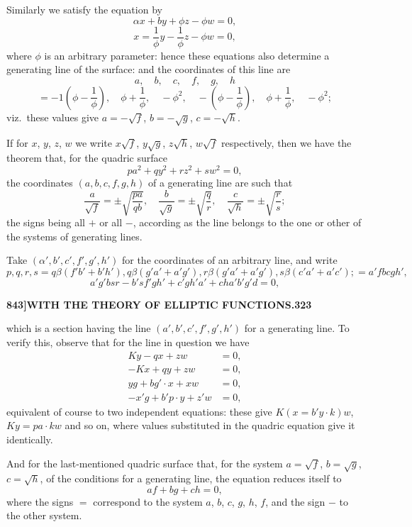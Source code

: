 \documentclass[11pt,a4paper]{book}
\begin{document}
Similarly we satisfy the equation by
\[
\alpha x + by + \phi z - \phi w = 0,
\]
\[
x = \frac{1}{\phi}y - \frac{1}{\phi}z - \phi w = 0,
\]
where $\phi$ is an arbitrary parameter: hence these equations also determine a generating line of the surface: and the coordinates of this line are
\[
a, \quad b, \quad c, \quad f, \quad g, \quad h
\]
\[
= -1\left(\phi - \frac{1}{\phi}\right), \quad \phi + \frac{1}{\phi}, \quad -\phi^2, \quad -\left(\phi - \frac{1}{\phi}\right), \quad \phi + \frac{1}{\phi}, \quad -\phi^2;
\]
viz.\ these values give $a = -\sqrt{f}$, $b = -\sqrt{g}$, $c = -\sqrt{h}$.

If for $x$, $y$, $z$, $w$ we write $x\sqrt{f}$, $y\sqrt{g}$, $z\sqrt{h}$, $w\sqrt{f}$ respectively, then we have the theorem that, for the quadric surface
\[
pa^2 + qy^2 + rz^2 + sw^2 = 0,
\]
the coordinates $(a, b, c, f, g, h)$ of a generating line are such that
\[
\frac{a}{\sqrt{f}} = \pm \sqrt{\frac{pa}{qb}}, \quad \frac{b}{\sqrt{g}} = \pm \sqrt{\frac{q}{r}}, \quad \frac{c}{\sqrt{h}} = \pm \sqrt{\frac{r}{s}};
\]
the signs being all $+$ or all $-$, according as the line belongs to the one or other of the systems of generating lines.

Take $(\alpha', b', c', f', g', h')$ for the coordinates of an arbitrary line, and write
\[
p, q, r, s = q\beta(f'b' + b'h'), q\beta(g'a' + a'g'), r\beta(g'a' + a'g'), s\beta(c'a' + a'c'); = a'fbcgh',
\]
\[
a'g'bsr - b'sf'gh' + c'gh'a' + cha'b'g'd = 0,
\]

\newpage
\setcounter{page}{323}

\noindent\textbf{843]}\hfill\textbf{WITH THE THEORY OF ELLIPTIC FUNCTIONS.}\hfill\textbf{323}

\bigskip

\noindent which is a section having the line $(a', b', c', f', g', h')$ for a generating line. To verify this, observe that for the line in question we have
\begin{align*}
Ky - qx + zw &= 0, \\
-Kx + qy + zw &= 0, \\
yg + bg' \cdot x + xw &= 0, \\
-x'g + b'p \cdot y + z'w &= 0,
\end{align*}
equivalent of course to two independent equations: these give $K(x = b'y \cdot k)w$, $Ky = pa \cdot kw$ and so on, where values substituted in the quadric equation give it identically.

And for the last-mentioned quadric surface that, for the system $a = \sqrt{f}$, $b = \sqrt{g}$, $c = \sqrt{h}$, of the conditions for a generating line, the equation reduces itself to
\[
af + bg + ch = 0,
\]
where the signs $=$ correspond to the system $a$, $b$, $c$, $g$, $h$, $f$, and the sign $-$ to the other system.
\end{document}
